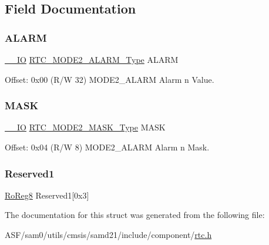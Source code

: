 \subsection{Field Documentation}
\mbox{\label{struct_rtc_mode2_alarm_a8a3b16e9cc201839a169154d46a636d4}} 
\subsubsection{\texorpdfstring{ALARM}{ALARM}}
{\footnotesize\ttfamily \mbox{\hyperlink{core__cm0plus_8h_aec43007d9998a0a0e01faede4133d6be}{\+\_\+\+\_\+\+IO}} \mbox{\hyperlink{union_r_t_c___m_o_d_e2___a_l_a_r_m___type}{R\+T\+C\+\_\+\+M\+O\+D\+E2\+\_\+\+A\+L\+A\+R\+M\+\_\+\+Type}} A\+L\+A\+RM}



Offset\+: 0x00 (R/W 32) M\+O\+D\+E2\+\_\+\+A\+L\+A\+RM Alarm n Value. 

\mbox{\label{struct_rtc_mode2_alarm_a2eafb97c42d3714baac1a2528aade5c0}} 
\subsubsection{\texorpdfstring{MASK}{MASK}}
{\footnotesize\ttfamily \mbox{\hyperlink{core__cm0plus_8h_aec43007d9998a0a0e01faede4133d6be}{\+\_\+\+\_\+\+IO}} \mbox{\hyperlink{union_r_t_c___m_o_d_e2___m_a_s_k___type}{R\+T\+C\+\_\+\+M\+O\+D\+E2\+\_\+\+M\+A\+S\+K\+\_\+\+Type}} M\+A\+SK}



Offset\+: 0x04 (R/W 8) M\+O\+D\+E2\+\_\+\+A\+L\+A\+RM Alarm n Mask. 

\mbox{\label{struct_rtc_mode2_alarm_a0ec4ccebd5bfbf4f17510e15a5a9ff81}} 
\subsubsection{\texorpdfstring{Reserved1}{Reserved1}}
{\footnotesize\ttfamily \mbox{\hyperlink{group___s_a_m_d21_e15_a__definitions_ga0d957f1433aaf5d70e4dc2b68288442d}{Ro\+Reg8}} Reserved1\mbox{[}0x3\mbox{]}}



The documentation for this struct was generated from the following file\+:\begin{DoxyCompactItemize}
\item 
A\+S\+F/sam0/utils/cmsis/samd21/include/component/\mbox{\hyperlink{component_2rtc_8h}{rtc.\+h}}\end{DoxyCompactItemize}
